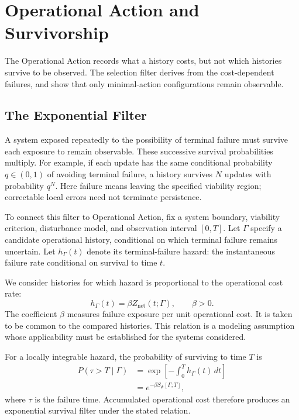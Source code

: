 \section{Operational Action and Survivorship}
\label{sec:minimum_action}

The Operational Action records what a history costs, but not which histories survive to be observed. The selection filter derives from the cost-dependent failures, and show that only minimal-action configurations remain observable.




\subsection{The Exponential Filter}
\label{subsec:exponential_filter}

A system exposed repeatedly to the possibility of terminal failure
must survive each exposure to remain observable. These successive
survival probabilities multiply. For example, if each update has
the same conditional probability $q\in(0,1)$ of avoiding terminal
failure, a history survives $N$ updates with probability $q^N$.
Here failure means leaving the specified viability region;
correctable local errors need not terminate persistence.

To connect this filter to Operational Action, fix a system boundary,
viability criterion, disturbance model, and observation interval
$[0,T]$. Let $\Gamma$ specify a candidate operational history,
conditional on which terminal failure remains uncertain. Let
$h_\Gamma(t)$ denote its terminal-failure hazard: the instantaneous
failure rate conditional on survival to time $t$.

We consider histories for which hazard is proportional to the
operational cost rate:
\begin{equation}
\label{eq:cost_proportional_hazard}
    h_\Gamma(t)
    = \beta Z_{\mathrm{net}}(t;\Gamma),
    \qquad \beta>0.
\end{equation}
The coefficient $\beta$ measures failure exposure per unit
operational cost. It is taken to be common to the compared
histories. This relation is a modeling assumption whose
applicability must be established for the systems considered.

For a locally integrable hazard, the probability of surviving
to time $T$ is
\begin{equation}
\label{eq:survival_prob}
\begin{split}
    P(\tau>T\mid\Gamma)
    &= \exp\!\left[-\int_0^T h_\Gamma(t)\,dt\right] \\
    &= e^{-\beta S_\Phi[\Gamma;T]},
\end{split}
\end{equation}
where $\tau$ is the failure time. Accumulated operational cost
therefore produces an exponential survival filter under the
stated relation.

